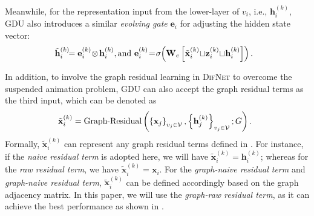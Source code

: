 \documentclass{article}
\newcommand{\mb}{\mathbf}
\newcommand{\mc}{\mathcal}
\newcommand{\our}{\textsc{DifNet}}
\newcommand{\gdu}{\textsc{GDU}}
\begin{document}
Meanwhile, for the representation input from the lower-layer of $v_i$, i.e., $\mb{h}_i^{(k)}$, {\gdu} also introduces a similar \textit{evolving gate} $\mb{e}_i$ for adjusting the hidden state vector:
\begin{equation}
\hspace{-7pt} \tilde{\mb{h}}_i^{(k)} \hspace{-4pt} = \mb{e}_i^{(k)} \hspace{-2pt} \otimes \hspace{-1pt} \mb{h}_i^{(k)}, \mbox{and  }\mb{e}_i^{(k)} \hspace{-2pt} = \hspace{-2pt}  \sigma \hspace{-2pt} \left( \mb{W}_e \left[\tilde{\mb{x}}_i^{(k)} \hspace{-2pt} \sqcup \hspace{-2pt} \mb{z}_i^{(k)} \hspace{-2pt} \sqcup \hspace{-2pt} \mb{h}_i^{(k)} \right] \right).
\end{equation}

In addition, to involve the graph residual learning \cite{Zhang_GResNet_19} in {\our} to overcome the suspended animation problem, {\gdu} can also accept the graph residual terms as the third input, which can be denoted as
\begin{equation}
\hspace{-5pt}\tilde{\mb{x}}_i^{(k)} = \mbox{Graph-Residual}\left(\left\{\mb{x}_j \right\}_{v_j \in \mc{V}}, \left\{\mb{h}_j^{(k)} \right\}_{v_j \in \mc{V}}; G \right).
\end{equation}
Formally, $\tilde{\mb{x}}_i^{(k)}$ can represent any graph residual terms defined in \cite{Zhang_GResNet_19}. For instance, if the \textit{naive residual term} is adopted here, we will have $\tilde{\mb{x}}_i^{(k)} = \mb{h}_i^{(k)}$; whereas for the \textit{raw residual term}, we have $\tilde{\mb{x}}_i^{(k)} = {\mb{x}}_i$. For the \textit{graph-naive residual term} and \textit{graph-naive residual term}, $\tilde{\mb{x}}_i^{(k)}$ can be defined accordingly based on the graph adjacency matrix. In this paper, we will use the \textit{graph-raw residual term}, as it can achieve the best performance as shown in \cite{Zhang_GResNet_19}.
\end{document}
